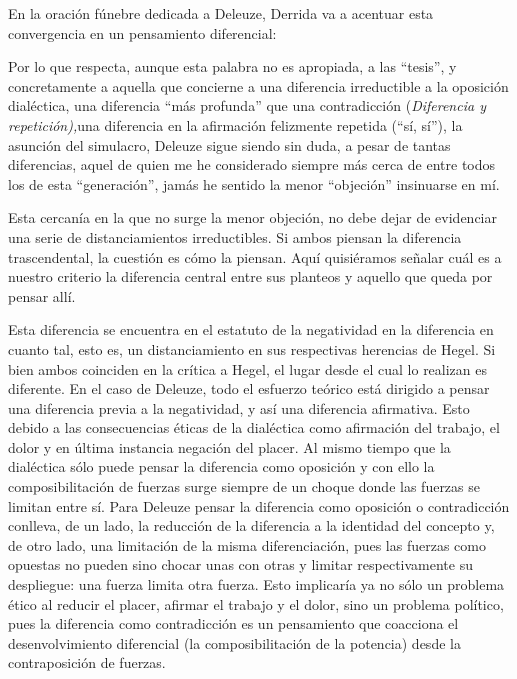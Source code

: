 En la oración fúnebre dedicada a Deleuze, Derrida va a acentuar esta convergencia en un pensamiento diferencial:

Por lo que respecta, aunque esta palabra no es apropiada, a las ``tesis'', y concretamente a aquella que concierne a una diferencia irreductible a la oposición dialéctica, una diferencia ``más profunda'' que una contradicción (\emph{Diferencia y repetición),}una diferencia en la afirmación felizmente repetida (``sí, sí''), la asunción del simulacro, Deleuze sigue siendo sin duda, a pesar de tantas diferencias, aquel de quien me he considerado siempre más cerca de entre todos los de esta ``generación'', jamás he sentido la menor ``objeción'' insinuarse en mí.

Esta cercanía en la que no surge la menor objeción, no debe dejar de evidenciar una serie de distanciamientos irreductibles. Si ambos piensan la diferencia trascendental, la cuestión es cómo la piensan. Aquí quisiéramos señalar cuál es a nuestro criterio la diferencia central entre sus planteos y aquello que queda por pensar allí.

Esta diferencia se encuentra en el estatuto de la negatividad en la diferencia en cuanto tal, esto es, un distanciamiento en sus respectivas herencias de Hegel. Si bien ambos coinciden en la crítica a Hegel, el lugar desde el cual lo realizan es diferente. En el caso de Deleuze, todo el esfuerzo teórico está dirigido a pensar una diferencia previa a la negatividad, y así una diferencia afirmativa. Esto debido a las consecuencias éticas de la dialéctica como afirmación del trabajo, el dolor y en última instancia negación del placer. Al mismo tiempo que la dialéctica sólo puede pensar la diferencia como oposición y con ello la composibilitación de fuerzas surge siempre de un choque donde las fuerzas se limitan entre sí. Para Deleuze pensar la diferencia como oposición o contradicción conlleva, de un lado, la reducción de la diferencia a la identidad del concepto y, de otro lado, una limitación de la misma diferenciación, pues las fuerzas como opuestas no pueden sino chocar unas con otras y limitar respectivamente su despliegue: una fuerza limita otra fuerza. Esto implicaría ya no sólo un problema ético al reducir el placer, afirmar el trabajo y el dolor, sino un problema político, pues la diferencia como contradicción es un pensamiento que coacciona el desenvolvimiento diferencial (la composibilitación de la potencia) desde la contraposición de fuerzas.

